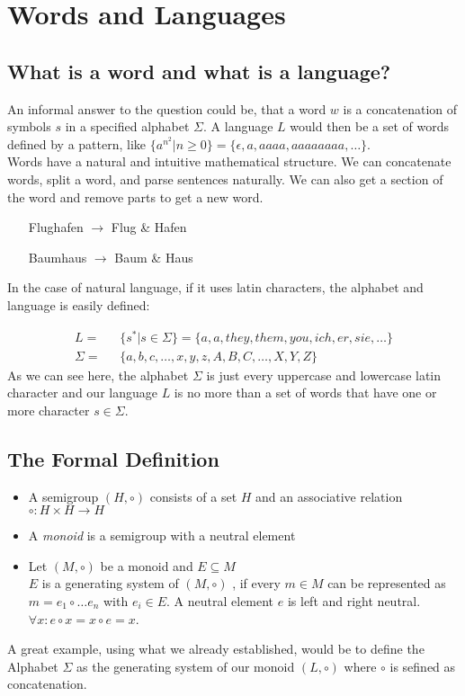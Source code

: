 \documentclass[a4paper, 11pt]{article}
\begin{document}
    \section{Words and Languages}
    \subsection{What is a word and what is a language?}
    An informal answer to the question could be, that a word $w$ is a concatenation of symbols $s$ in a specified alphabet $\Sigma$.
    A language $L$ would then be a set of words defined by a pattern, like $\{a^{n^{2}}|n \geq 0 \} = \{\epsilon, a, aaaa, aaaaaaaa, \dots\}$.
    \\
    Words have a natural and intuitive mathematical structure. We can concatenate words, split a word, and parse sentences naturally. 
    We can also get a section of the word and remove parts to get a new word.
    \begin{itemize}
      \centering
      \item[Flughafen $\rightarrow$] Flug \& Hafen
      \item[Baumhaus $\rightarrow$] Baum \& Haus  
    \end{itemize}
    In the case of natural language, if it uses latin characters, the alphabet and language is easily defined:

    \begin{align}
            L = & \mbox{ } \{s^* | s\in \Sigma\} = \{a, a, they, them, you, ich, er, sie, \dots\}\\
       \Sigma = &\mbox{ }  \{a,b,c,\dots,x,y,z,A,B,C,\dots,X,Y,Z\}
    \end{align}
    As we can see here, the alphabet $\Sigma$ is just every uppercase and lowercase latin character and our language $L$ is
    no more than a set of words that have one or more character $s\in\Sigma$.

    \subsection{The Formal Definition}
    \begin{itemize}
      \item A semigroup $(H, \circ)$ consists of a set $H$ and an associative relation $\circ:H\times H \rightarrow H$
      \item A \emph{monoid} is a semigroup with a neutral element
      \item Let $(M, \circ)$ be a monoid and $E \subseteq M$\\
            $E$ is a generating system of $(M, \circ)$ , if every $m\in M$ can be represented as $m=e_1\circ\dots e_n$ with $e_i \in E$.
            A neutral element $e$ is left and right neutral. $\forall x : e\circ x = x\circ e = x$.
    \end{itemize}
    A great example, using what we already established, would be to define the Alphabet $\Sigma$ as the generating system of our monoid 
    $(L, \circ)$ where $\circ$ is sefined as concatenation.
\end{document}
